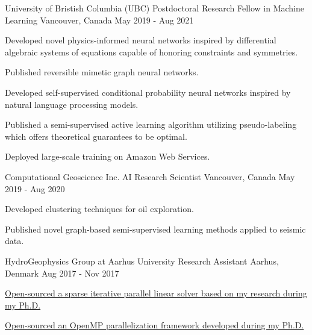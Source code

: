 \begin{cventries}
  \cventry
  {University of Bristish Columbia (UBC)} %
  {Postdoctoral Research Fellow in Machine Learning} %
    {Vancouver, Canada} %
    {May 2019 - Aug 2021} %
    {
      \begin{cvitems} %
        \item {Developed novel physics-informed neural networks inspired by differential algebraic systems of equations capable of honoring constraints and symmetries.}
        \item {Published reversible mimetic graph neural networks.}
        \item {Developed self-supervised conditional probability neural networks inspired by natural language processing models.}
        \item {Published a semi-supervised active learning algorithm utilizing pseudo-labeling which offers theoretical guarantees to be optimal.}
        \item {Deployed large-scale training on Amazon Web Services.}
      \end{cvitems}
    }

  \cventry
  {Computational Geoscience Inc.} %
  {AI Research Scientist} %
    {Vancouver, Canada} %
    {May 2019 - Aug 2020} %
    {
      \begin{cvitems} %
        \item {Developed clustering techniques for oil exploration.}
        \item {Published novel graph-based semi-supervised learning methods applied to seismic data.}
      \end{cvitems}
    }

  \cventry
  {HydroGeophysics Group at Aarhus University} %
  {Research Assistant} %
    {Aarhus, Denmark} %
    {Aug 2017 - Nov 2017} %
    {
      \begin{cvitems} %
        \item {\href{https://github.com/tueboesen/Sparse-iterative-parallel-linear-solver}{Open-sourced a sparse iterative parallel linear solver based on my research during my Ph.D.}}
        \item {\href{https://github.com/tueboesen/Parallelization-Framework}{Open-sourced an OpenMP parallelization framework developed during my Ph.D.}}
      \end{cvitems}
    }


\end{cventries}
